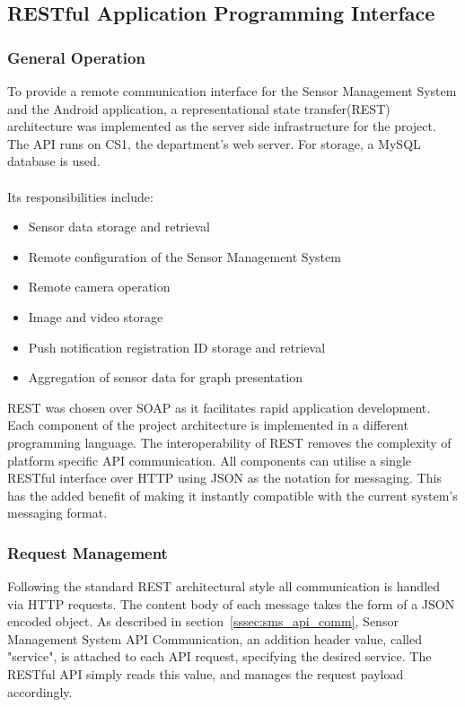 \documentclass{article}
\begin{document}
\newpage

\subsection{RESTful Application Programming Interface}
\subsubsection{General Operation}
To provide a remote communication interface for the Sensor Management System and the Android application, a representational state transfer(REST) architecture was implemented as the server side infrastructure for the project. The API runs on CS1, the department’s web server. For storage, a MySQL database is used.  \\\\
Its responsibilities include:
\begin{itemize}
  \item Sensor data storage and retrieval
  \item Remote configuration of the Sensor Management System
  \item Remote camera operation
  \item Image and video storage
  \item Push notification registration ID storage and retrieval
  \item Aggregation of sensor data for graph presentation
\end{itemize}
REST was chosen over SOAP as it facilitates rapid application development. Each component of the project architecture is implemented in a different programming language. The interoperability of REST removes the complexity of platform specific API communication. All components can utilise a single RESTful interface over HTTP using  JSON as the notation for messaging. This has the added benefit of making it instantly compatible with the current system’s messaging format.

\subsubsection{Request Management}
Following the standard REST architectural style all communication is handled via HTTP requests. The content body of each message takes the form of a JSON encoded object. As described in section~\ref{sssec:sms_api_comm}, Sensor Management System API Communication, an addition header value, called "service", is attached to each API request, specifying the desired service. The RESTful API simply reads this value, and manages the request payload accordingly.
\end{document}
